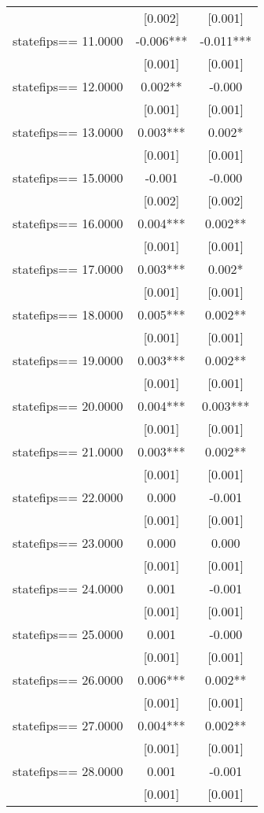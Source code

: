 \documentclass[]{article}
\begin{document}
\begin{tabular}{lcc}
 & [0.002] & [0.001] \\
statefips==    11.0000 & -0.006*** & -0.011*** \\
 & [0.001] & [0.001] \\
statefips==    12.0000 & 0.002** & -0.000 \\
 & [0.001] & [0.001] \\
statefips==    13.0000 & 0.003*** & 0.002* \\
 & [0.001] & [0.001] \\
statefips==    15.0000 & -0.001 & -0.000 \\
 & [0.002] & [0.002] \\
statefips==    16.0000 & 0.004*** & 0.002** \\
 & [0.001] & [0.001] \\
statefips==    17.0000 & 0.003*** & 0.002* \\
 & [0.001] & [0.001] \\
statefips==    18.0000 & 0.005*** & 0.002** \\
 & [0.001] & [0.001] \\
statefips==    19.0000 & 0.003*** & 0.002** \\
 & [0.001] & [0.001] \\
statefips==    20.0000 & 0.004*** & 0.003*** \\
 & [0.001] & [0.001] \\
statefips==    21.0000 & 0.003*** & 0.002** \\
 & [0.001] & [0.001] \\
statefips==    22.0000 & 0.000 & -0.001 \\
 & [0.001] & [0.001] \\
statefips==    23.0000 & 0.000 & 0.000 \\
 & [0.001] & [0.001] \\
statefips==    24.0000 & 0.001 & -0.001 \\
 & [0.001] & [0.001] \\
statefips==    25.0000 & 0.001 & -0.000 \\
 & [0.001] & [0.001] \\
statefips==    26.0000 & 0.006*** & 0.002** \\
 & [0.001] & [0.001] \\
statefips==    27.0000 & 0.004*** & 0.002** \\
 & [0.001] & [0.001] \\
statefips==    28.0000 & 0.001 & -0.001 \\
 & [0.001] & [0.001] \\

\end{tabular}
\end{document}
